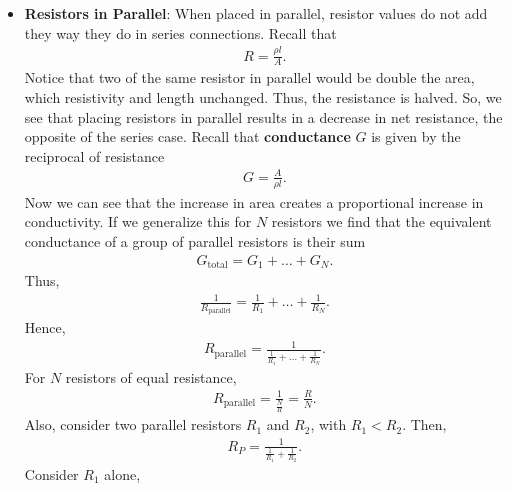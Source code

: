 \documentclass{report}
\begin{document}
\begin{itemize}
            \bigbreak \noindent 
        \item \textbf{Resistors in Parallel}: When placed in parallel, resistor values do not add they way they do in series connections.
            \bigbreak \noindent 
            \bigbreak \noindent 
            Recall that 
            \begin{align*}
                R = \frac{\rho l}{A}
            .\end{align*}
            Notice that two of the same resistor in parallel would be double the area, which resistivity and length unchanged. Thus, the resistance is halved. So, we see that placing resistors in parallel results in a decrease in net resistance, the opposite of the series case.
            \bigbreak \noindent 
            Recall that \textbf{conductance} $G$ is given by the reciprocal of resistance
            \begin{align*}
                G = \frac{A}{\rho l}
            .\end{align*}
            Now we can see that the increase in area creates a proportional increase in conductivity. If we generalize this for $N$ resistors we find that the equivalent conductance of a group of parallel resistors is their sum
            \begin{align*}
                G_{\text{total}} = G_{1} + \dots + G_{N}
            .\end{align*}
            Thus,
            \begin{align*}
                \frac{1}{R_{\text{parallel}}} = \frac{1}{R_{1}} + \dots + \frac{1}{R_{N}}
            .\end{align*}
            Hence,
            \begin{align*}
                R_{\text{parallel}} = \frac{1}{\frac{1}{R_{1}} + \dots + \frac{1}{R_{N}}}
            .\end{align*}
            For $N$ resistors of equal resistance, 
            \begin{align*}
                R_{\text{parallel}} = \frac{1}{\frac{N}{R}} = \frac{R}{N}
            .\end{align*}
            Also, consider two parallel resistors $R_{1}$ and $R_{2}$, with $R_{1} < R_{2}$. Then,
            \begin{align*}
                R_{P} = \frac{1}{\frac{1}{R_{1}} + \frac{1}{R_{2}}}
            .\end{align*}
            Consider $R_{1}$ alone,

\end{itemize}
\end{document}
